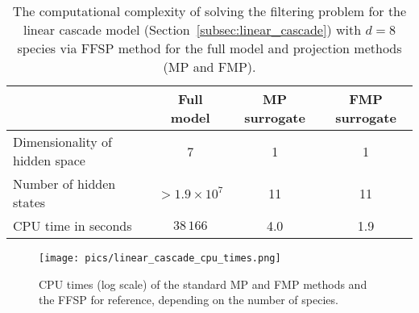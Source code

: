 \begin{table}%
    \centering 
    \def\arraystretch{1.25}
    \begin{tabular}{|l|c|c|c|} \cline{2-4}
        \multicolumn{1}{c|}{} & \textbf{Full model} & \textbf{\ac{MP} surrogate} & \textbf{\ac{FMP} surrogate} \\ \hline
        {Dimensionality of hidden space} & 7 & 1 & 1 \\ \hline
        {Number of hidden states} & $> 1.9\times 10^7$ & 11 & 11 \\ \hline
        {CPU time in seconds} & $38 \, 166$ & 4.0 & 1.9 \\ \hline
    \end{tabular}
    \caption{The computational complexity of solving the filtering problem for the linear cascade model (Section~\ref{subsec:linear_cascade}) with $d=8$ species via \ac{FFSP} method for the full model and projection methods (\ac{MP} and \ac{FMP}).}
    \label{tab:linear_cascade_results}
\end{table}



\begin{figure}
    \centering
    \texttt{[image: pics/linear\_cascade\_cpu\_times.png]}
    \caption{
     CPU times (log scale) of the standard \ac{MP} and \ac{FMP} methods and the \ac{FFSP} for reference, depending on the number of species. 
     }
    \label{fig:linear_cascade_cpu_time}
\end{figure}